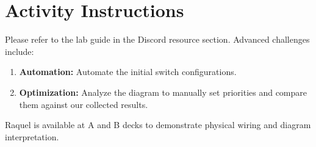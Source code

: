 \documentclass[11pt]{article}
\begin{document}
\section{Activity Instructions}
Please refer to the lab guide in the Discord resource section. Advanced challenges include:
\begin{enumerate}
    \item \textbf{Automation:} Automate the initial switch configurations.
    \item \textbf{Optimization:} Analyze the diagram to manually set priorities and compare them against our collected results.
\end{enumerate}

Raquel is available at A and B decks to demonstrate physical wiring and diagram interpretation.
\end{document}
